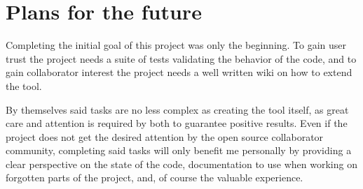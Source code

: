 \chapter{Plans for the future}

Completing the initial goal of this project was only the beginning. To gain user trust the project needs a suite of tests validating the behavior of the code, and to gain collaborator interest the project needs a well written wiki on how to extend the tool.

By themselves said tasks are no less complex as creating the tool itself, as great care and attention is required by both to guarantee positive results. Even if the project does not get the desired attention by the open source collaborator community, completing said tasks will only benefit me personally by providing a clear perspective on the state of the code, documentation to use when working on forgotten parts of the project, and, of course the valuable experience.